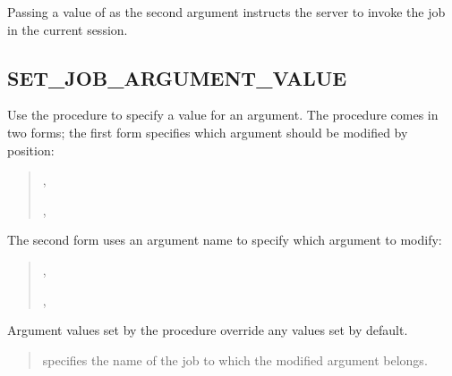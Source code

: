 \documentclass[letterpaper,10pt,english,openany,oneside]{sphinxmanual}
\begin{document}
Passing a value of  as the second argument instructs the server to
invoke the job in the current session.

\newpage


\subsection{SET\_JOB\_ARGUMENT\_VALUE}
\label{\detokenize{set_job_argument_value::doc}}\label{\detokenize{set_job_argument_value:set-job-argument-value}}
Use the  procedure to specify a value for an
argument. The  procedure comes in two forms;
the first form specifies which argument should be modified by position:
\begin{quote}

\begin{DUlineblock}{0em}
\item[] 
\item[] ,
\item[] ,
\item[] 
\end{DUlineblock}
\end{quote}

The second form uses an argument name to specify which argument to
modify:
\begin{quote}

\begin{DUlineblock}{0em}
\item[] 
\item[] ,
\item[] ,
\item[] 
\end{DUlineblock}
\end{quote}

Argument values set by the  procedure override
any values set by default.


\begin{quote}

 specifies the name of the job to which the modified
argument belongs.
\end{quote}
\end{document}
